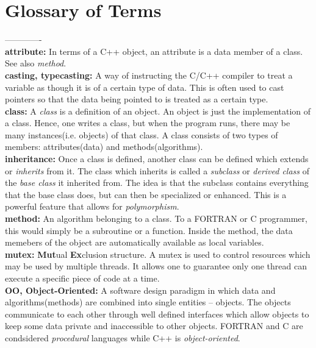 \documentclass[12pt]{article}
\begin{document}


\newpage
\section{Glossary of Terms}
\label{glossary}

-------------\\

{\bf attribute:} In terms of a C++ object, an attribute is a data
member of a class. See also {\it method}.\\

{\bf casting, typecasting:} A way of instructing the C/C++ compiler to
treat a variable as though it is of a certain type of data. This is
often used to cast pointers so that the data being pointed to is treated
as a certain type.\\


{\bf class:} A {\it class} is a definition of an object. An object
is just the implementation of a class. Hence, one writes a class, but
when the program runs, there may be many instances(i.e. objects) of that
class. A class consists of two types of members: attributes(data) and
methods(algorithms).\\


{\bf inheritance:} Once a class is defined, another class can be
defined which extends or {\it inherits} from it. The class which inherits
is called a {\it subclass} or {\it derived class} of the {\it base class}
it inherited from.
The idea is that the subclass contains everything that the base class
does, but can then be specialized or enhanced. This is a powerful feature
that allows for {\it polymorphism}.\\


{\bf method:} An algorithm belonging to a class. To a FORTRAN or C
programmer, this would simply be a subroutine or a function. Inside
the method, the data memebers of the object are automatically available as
local variables.\\


{\bf mutex:} {\bf Mut}ual {\bf Ex}clusion structure. A mutex is
used to control resources which may be used by multiple threads.
It allows one to guarantee only one thread can execute a specific
piece of code at a time.\\


{\bf OO, Object-Oriented:} A software design paradigm in which data
and algorithms(methods) are combined into single entities -- objects. The
objects communicate to each other through well defined interfaces which
allow objects to keep some data private and inaccessible to other objects.
FORTRAN and C are condsidered {\it procedural} languages while C++ is
{\it object-oriented}.\\
\end{document}
